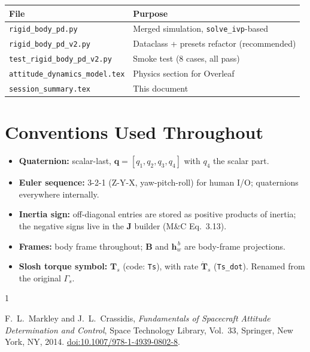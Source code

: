 \begin{center}
\begin{tabular}{ll}
\toprule
\textbf{File} & \textbf{Purpose} \\
\midrule
\texttt{rigid\_body\_pd.py}            & Merged simulation, \texttt{solve\_ivp}-based \\
\texttt{rigid\_body\_pd\_v2.py}        & Dataclass + presets refactor (recommended) \\
\texttt{test\_rigid\_body\_pd\_v2.py}  & Smoke test (8 cases, all pass) \\
\texttt{attitude\_dynamics\_model.tex} & Physics section for Overleaf \\
\texttt{session\_summary.tex}          & This document \\
\bottomrule
\end{tabular}
\end{center}


\section{Conventions Used Throughout}

\begin{itemize}\setlength{\itemsep}{1pt}
  \item \textbf{Quaternion:} scalar-last, \(\bm{q}=[q_1, q_2, q_3, q_4]\)
        with \(q_4\) the scalar part.
  \item \textbf{Euler sequence:} 3-2-1 (Z-Y-X, yaw-pitch-roll) for human
        I/O; quaternions everywhere internally.
  \item \textbf{Inertia sign:} off-diagonal entries are stored as positive
        products of inertia; the negative signs live in the \(\bm{J}\)
        builder (M\&C Eq.~3.13).
  \item \textbf{Frames:} body frame throughout; \(\bm{B}\) and
        \(\bm{h}_w^{\,b}\) are body-frame projections.
  \item \textbf{Slosh torque symbol:} \(\bm{T}_s\) (code: \texttt{Ts}),
        with rate \(\dot{\bm{T}}_s\) (\texttt{Ts\_dot}). Renamed from the
        original \(\Gamma_s\).
\end{itemize}


\begin{thebibliography}{1}

F.~L.~Markley and J.~L.~Crassidis,
\emph{Fundamentals of Spacecraft Attitude Determination and Control},
Space Technology Library, Vol.~33,
Springer, New York, NY, 2014.
\href{https://doi.org/10.1007/978-1-4939-0802-8}{doi:10.1007/978-1-4939-0802-8}.

\end{thebibliography}


